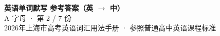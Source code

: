 \documentclass[10pt,a4paper]{article}
\begin{document}
\pagestyle{plain}

\begin{center}
{\LARGE\bfseries 英语单词默写 \quad 参考答案（英 $\to$ 中）}\\[0.22em]
{\large A 字母 · 第 2 / 7 份}\\[0.18em]
{\small 2026年上海市高考英语词汇用法手册 · 参照普通高中英语课程标准}
\end{center}

\vspace{0.2em}
\noindent{\color{rulegray}\rule{\textwidth}{0.8pt}}

\vspace{0.35em}

\vspace{0.25em}
\renewcommand{\arraystretch}{1.32}
\end{document}
